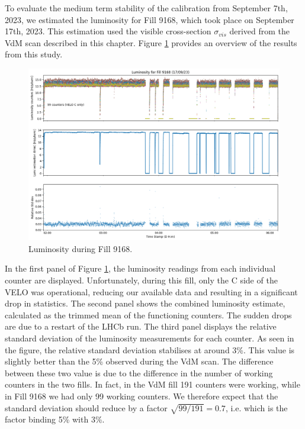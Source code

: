 To evaluate the medium term stability of the calibration from September 7th, 2023, we estimated the luminosity for Fill 9168, which took place on September 17th, 2023. This estimation used the visible cross-section $\sigma_{vis}$ derived from the VdM scan described in this chapter. Figure \ref{fig:fill9168} provides an overview of the results from this study.
\begin{figure}
    \centering
    \includegraphics[width=\textwidth]{figures/fill9168.png}
    \caption{Luminosity during Fill 9168.}
    \label{fig:fill9168}
\end{figure}
In the first panel of Figure \ref{fig:fill9168}, the luminosity readings from each individual counter are displayed. Unfortunately, during this fill, only the C side of the VELO was operational, reducing our available data and resulting in a significant drop in statistics. The second panel shows the combined luminosity estimate, calculated as the trimmed mean of the functioning counters. The sudden drops are due to a restart of the LHCb run.  The third panel displays the relative standard deviation of the luminosity measurements for each counter. As seen in the figure, the relative standard deviation stabilises at around 3\%. This value is slightly better than the 5\% observed during the VdM scan. The difference between these two value is due to the difference in the number of working counters in the two fills. In fact, in the VdM fill 191 counters were working, while in Fill 9168 we had only 99 working counters. We therefore expect that the standard deviation should reduce by a factor $\sqrt{99/191}=0.7$, i.e. which is the factor binding 5\% with 3\%.

